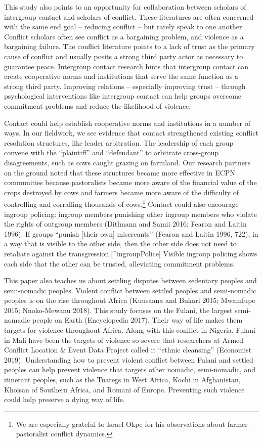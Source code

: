 \documentclass[11pt]{article}
\begin{document}
This study also points to an opportunity for collaboration between
scholars of intergroup contact and scholars of conflict. These
literatures are often concerned with the same end goal -- reducing
conflict -- but rarely speak to one another. Conflict scholars often see
conflict as a bargaining problem, and violence as a bargaining failure.
The conflict literature points to a lack of trust as the primary cause
of conflict and usually posits a strong third party actor as necessary
to guarantee peace. Intergroup contact research hints that intergroup
contact can create cooperative norms and institutions that serve the
same function as a strong third party. Improving relations -- especially
improving trust -- through psychological interventions like intergroup
contact can help groups overcome commitment problems and reduce the
likelihood of violence.

Contact could help establish cooperative norms and institutions in a
number of ways. In our fieldwork, we see evidence that contact
strengthened existing conflict resolution structures, like leader
arbitration. The leadership of each group convene with the ``plaintiff''
and ``defendant'' to arbitrate cross-group disagreements, such as cows
caught grazing on farmland. Our research partners on the ground noted
that these structures became more effective in ECPN communities because
pastoralists became more aware of the financial value of the crops
destroyed by cows and farmers became more aware of the difficulty of
controlling and corralling thousands of cows.\footnote{We are especially
  grateful to Israel Okpe for his observations about farmer-pastoralist
  conflict dynamics.} Contact could also encourage ingroup policing:
ingroup members punishing other ingroup members who violate the rights
of outgroup members (Ditlmann and Samii 2016; Fearon and Laitin 1996).
If groups ``punish {[}their own{]} miscreants'' (Fearon and Laitin 1996,
722), in a way that is visible to the other side, then the other side
does not need to retaliate against the
transgression.{[}\^{}ingroupPolice{]} Visible ingroup policing shows
each side that the other can be trusted, alleviating commitment
problems.

This paper also teaches us about settling disputes between sedentary
peoples and semi-nomadic peoples. Violent conflict between settled
peoples and semi-nomadic peoples is on the rise throughout Africa
(Kuusaana and Bukari 2015; Mwamfupe 2015; Nnoko-Mewanu 2018). This study
focuses on the Fulani, the largest semi-nomadic people on Earth
(Encyclopedia 2017). Their way of life makes them targets for violence
throughout Africa. Along with this conflict in Nigeria, Fulani in Mali
have been the targets of violence so severe that researchers at Armed
Conflict Location \& Event Data Project called it ``ethnic cleansing''
(Economist 2019). Understanding how to prevent violent conflict between
Fulani and settled peoples can help prevent violence that targets other
nomadic, semi-nomadic, and itinerant peoples, such as the Tuaregs in
West Africa, Kochi in Afghanistan, Khoisan of Southern Africa, and
Romani of Europe. Preventing such violence could help preserve a dying
way of life.
\end{document}
